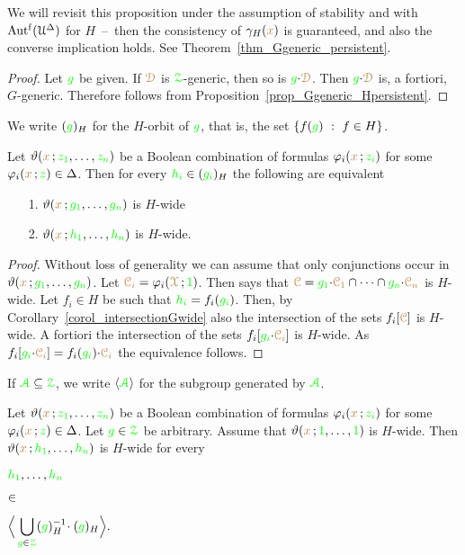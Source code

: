 We will revisit this proposition under the assumption of stability and with $\mbox{Aut$^{\rm f}$}(\EuScript U^\Delta)$ for $H$~--~then the consistency of $\gamma_H({\color{brown} x})$ is guaranteed, and also the converse implication holds.
See Theorem~\ref{thm_Ggeneric_persistent}.\vspace*{-0.5\baselineskip}
%
\begin{proof}
  Let ${\color{green} g}$ be given.
  If ${\color{brown}\EuScript D}$ is ${\color{green}\EuScript Z}$-generic, then so is ${\color{green} g}{\cdot}{\color{brown}\EuScript D}$.
  Then ${\color{green} g}{\cdot}{\color{brown}\EuScript D}$ is, a fortiori, $G$-generic.
  Therefore  follows from Proposition~\ref{prop_Ggeneric_Hpersistent}.
\end{proof}

We write \emph{$({\color{green} g})_H$\/} for the $H$-orbit of ${\color{green} g}$, that is, the set $\{f({\color{green} g})\ :\ f\in H\}$.

\begin{proposition}\label{prop_wideHcojugate}
  Let $\vartheta({\color{brown} x}\,;{\color{green} z_1},\dots,{\color{green} z_n})$ be a Boolean combination of formulas $\varphi_i({\color{brown} x}\,;{\color{green} z_i})$ for some $\varphi_i({\color{brown} x}\,;{\color{green} z})\in\Delta$.
  Then for every ${\color{green} h_i}\in({\color{green} g_i})_H$ the following are equivalent
  \begin{itemize}
    \item [1.] $\vartheta({\color{brown} x}\,;{\color{green} g_1},\dots,{\color{green} g_n})$ is $H$-wide
    \item [2.] $\vartheta({\color{brown} x}\,;{\color{green} h_1},\dots,{\color{green} h_n})$ is $H$-wide.
  \end{itemize}
\end{proposition}

\begin{proof}
  Without loss of generality we can assume that only conjunctions occur in $\vartheta({\color{brown} x}\,;{\color{green} g_1},\dots,{\color{green} g_n})$.
  Let ${\color{brown}\EuScript C_i}=\varphi_i({\color{brown}\EuScript X}\,;{\color{green} 1})$.
  Then  says that ${\color{brown}\EuScript C}={\color{green} g_1}{\cdot}{\color{brown}\EuScript C_1}\cap\dots\cap{\color{green}g_n}{\cdot}{\color{brown}\EuScript C_n}$ is $H$-wide.
  Let $f_i\in H$ be such that ${\color{green} h_i}=f_i({\color{green} g_i})$.
  Then, by Corollary~\ref{corol_intersectionGwide} also the intersection of the sets $f_i[{\color{brown}\EuScript C}]$ is $H$-wide.
  A fortiori the intersection of the sets $f_i[{\color{green} g_i}{\cdot}{\color{brown}\EuScript C_i}]$ is $H$-wide.
  As $f_i[{\color{green} g_i}{\cdot}{\color{brown}\EuScript C_i}]=f_i({\color{green} g_i}){\cdot}{\color{brown}\EuScript C_i}$ the equivalence follows.
\end{proof}

If ${\color{green}\EuScript A}\subseteq{\color{green}\EuScript Z}$, we write \emph{$\langle{\color{green}\EuScript A}\rangle$} for the subgroup generated by ${\color{green}\EuScript A}$.

\begin{proposition}\label{prop_stabilizer1}
  \def\medrel#1{\parbox[t]{5ex}{$\displaystyle\hfil #1$}}
  \def\ceq#1#2#3{\parbox[t]{15ex}{$\displaystyle #1$}\medrel{#2}{$\displaystyle #3$}}
  Let $\vartheta({\color{brown} x}\,;{\color{green} z_1},\dots,{\color{green} z_n})$ be a Boolean combination of formulas $\varphi_i({\color{brown} x}\,;{\color{green} z_i})$ for some $\varphi_i({\color{brown} x}\,;{\color{green} z})\in\Delta$.
  Let ${\color{green} g}\in{\color{green}\EuScript Z}$ be arbitrary.
  Assume that $\vartheta({\color{brown} x}\,;{\color{green} 1},\dots,{\color{green} 1})$ is $H$-wide.
  Then $\vartheta({\color{brown} x}\,;{\color{green} h_1},\dots,{\color{green} h_n})$ is $H$-wide for every 
  
  \ceq{\hfill{\gr h_1},\dots,{\gr h_n}}{\in}{\Big\<\bigcup_{{\gr g}\in\grZ}({\gr g})_H^{-1}\!\cdot({\gr g})_H\Big\>.}
\end{proposition}

